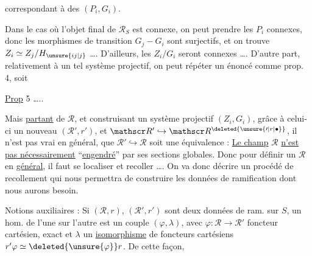 correspondant à des $(P_i,G_i)$.

Dans le cas où l'objet final de $\mathscr R_S$ est connexe, on peut prendre les $P_i$ connexes, donc les morphismes de transition $G_j-G_i$ sont surjectifs, et on trouve $Z_i\simeq Z_j/H_{\unsure{ij|j}}$ \ldots. D'ailleurs, les $Z_i/G_i$ seront connexes \ldots. D'autre part, relativement à un tel système projectif, on peut répéter un énoncé comme prop. 4, soit

\uline{Prop} 5 \ldots..

Mais  \uline{partant} de $\mathscr R$, et construisant un système projectif $(Z_i,G_i)$,  grâce à celui-ci un nouveau  $(\mathscr R',r')$, et $\mathscr R'\hookrightarrow\mathscr R^{\deleted{\unsure{\prime|r|\bullet}}}$, il n'est pas vrai en général,  que $\mathscr R'\hookrightarrow\mathscr R$ soit une équivalence : \uline{Le champ} $\mathscr R$ \uline{n'est pas nécessairement} ``\uline{engendré}'' par ses sections globales. Donc pour définir un $\mathscr R$ en \uline{général}, il faut se localiser et recoller \ldots. On va donc décrire un procédé de recollement qui nous permettra de construire les données de ramification dont nous aurons besoin.

Notions auxiliaires : Si $(\mathscr R,r)$, $(\mathscr R',r')$ sont deux données de ram. sur $S$, un hom. de l'une sur l'autre est un couple $(\varphi,\lambda)$, avec $\varphi:\mathscr R\longrightarrow\mathscr R'$  foncteur cartésien, exact  et $\lambda$ un \uline{isomorphisme} de foncteurs cartésiens $r'\varphi\simeq\deleted{\unsure{\varphi}}r$.  De cette façon,

